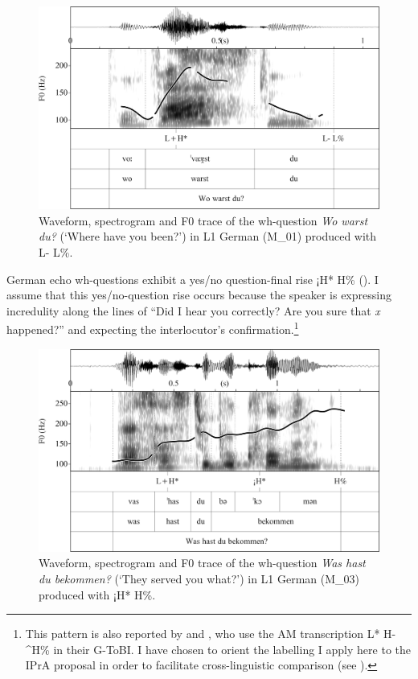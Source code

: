 \vfill
\begin{figure}[H]
\includegraphics[width=\textwidth]{figures/Figure_4.105.png}
\caption{Waveform, spectrogram and F0 trace of the wh-question \textit{Wo warst du?} (‘Where have you been?’) in L1 German (M\_01) produced with L- L\%.}
\label{fig:4.105}
\end{figure}
\vfill\pagebreak

German echo wh-questions exhibit a yes/no question-final rise ¡H* H\% (). I assume that this yes/no-question rise occurs because the speaker is expressing incredulity along the lines of “Did I hear you correctly? Are you sure that \textit{x} happened?” and expecting the interlocutor’s confirmation.\footnote{This pattern is also reported by \citet{vonEssen1964} and \citet{GriceBaumann2002}, who use the AM transcription L* H-\^{}H\% in their G-ToBI. I have chosen to orient the labelling I apply here to the IPrA proposal in order to facilitate cross-linguistic comparison (see \citealt{PrietoEtAl2015b,PrietoEtAl2015c}).}

\begin{figure}


\includegraphics[width=\textwidth]{figures/Figure_4.106.png}



\caption{Waveform, spectrogram and F0 trace of the wh-question \textit{Was hast du bekommen?} (‘They served you what?’) in L1 German (\mbox{M\_03}) produced with ¡H* H\%.}
\label{fig:4.106}
\end{figure}

